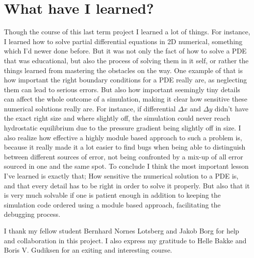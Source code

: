 \documentclass{emulateapj}
\begin{document}
	\section*{What have I learned?}
	Though the course of this last term project I learned a lot of things. For instance, I learned how to solve partial differential equations in 2D numerical, something which I'd newer done before. But it was not only the fact of how to solve a PDE that was educational, but also the process of solving them in it self, or rather the things learned from mastering the obstacles on the way. One example of that is how important the right boundary conditions for a PDE really are, as neglecting them can lead to serious errors. But also how important seemingly tiny details can affect the whole outcome of a simulation, making it clear how sensitive these numerical solutions really are. For instance, if differential $\Delta x$ and $\Delta y$ didn't have the exact right size and where slightly off, the simulation could never reach hydrostatic equilibrium due to the pressure gradient being slightly off in size. I also realize how effective a highly module based approach to such a problem is, because it really made it a lot easier to find bugs when being able to distinguish between different sources of error, not being confronted by a mix-up of all error sourced in one and the same spot. To conclude I think the most important lesson I've learned is exactly that; How sensitive the numerical solution to a PDE is, and that every detail has to be right in order to solve it properly. But also that it is very much solvable if one is patient enough in addition to keeping the simulation code ordered using a module based approach, facilitating the debugging process.
	
	
	

	
	\begin{acknowledgements}
		I thank my fellow student Bernhard Nornes Lotsberg and Jakob Borg for help and collaboration in this project. I also express my gratitude to Helle Bakke and Boris V. Gudiksen for an exiting and interesting course.
	\end{acknowledgements}

%
%
\end{document}
